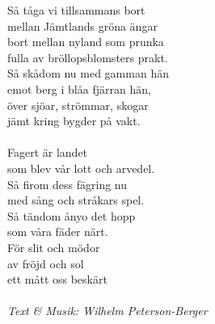\vspace{10pt}
Så tåga vi tillsammans bort\\
mellan Jämtlands gröna ängar\\
bort mellan nyland som prunka\\
fulla av bröllopsblomsters prakt.\\
Så skådom nu med gamman hän\\
emot berg i blåa fjärran hän,\\
över sjöar, strömmar, skogar\\
jämt kring bygder på vakt.\\
\\
\revrpt Fagert är landet\\
som blev vår lott och arvedel.\\
Så firom dess fägring nu\\
med sång och stråkars spel.\\
Så tändom ånyo det hopp\\
som våra fäder närt.\\
För slit och mödor\\
av fröjd och sol\\
ett mått oss beskärt\rpt\\
\\
{\footnotesize\textit{Text \& Musik: Wilhelm Peterson-Berger}}
\clearpage
